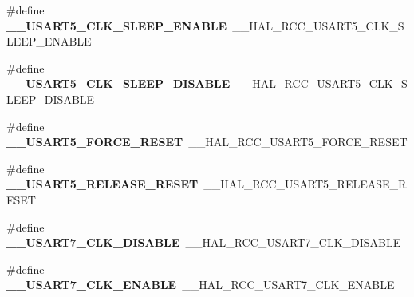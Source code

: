 \begin{DoxyCompactItemize}
\item 
\hypertarget{group___h_a_l___r_c_c___aliased_gab2e735cf263fe2d66068649c893f9421}{\#define {\bfseries \-\_\-\-\_\-\-U\-S\-A\-R\-T5\-\_\-\-C\-L\-K\-\_\-\-S\-L\-E\-E\-P\-\_\-\-E\-N\-A\-B\-L\-E}~\-\_\-\-\_\-\-H\-A\-L\-\_\-\-R\-C\-C\-\_\-\-U\-S\-A\-R\-T5\-\_\-\-C\-L\-K\-\_\-\-S\-L\-E\-E\-P\-\_\-\-E\-N\-A\-B\-L\-E}\label{group___h_a_l___r_c_c___aliased_gab2e735cf263fe2d66068649c893f9421}

\item 
\hypertarget{group___h_a_l___r_c_c___aliased_ga3ebcd8aa43ec53601b15d7ddd88c7a5f}{\#define {\bfseries \-\_\-\-\_\-\-U\-S\-A\-R\-T5\-\_\-\-C\-L\-K\-\_\-\-S\-L\-E\-E\-P\-\_\-\-D\-I\-S\-A\-B\-L\-E}~\-\_\-\-\_\-\-H\-A\-L\-\_\-\-R\-C\-C\-\_\-\-U\-S\-A\-R\-T5\-\_\-\-C\-L\-K\-\_\-\-S\-L\-E\-E\-P\-\_\-\-D\-I\-S\-A\-B\-L\-E}\label{group___h_a_l___r_c_c___aliased_ga3ebcd8aa43ec53601b15d7ddd88c7a5f}

\item 
\hypertarget{group___h_a_l___r_c_c___aliased_gaebc2c005ab8b9526cc9d9aa8d2fbc99d}{\#define {\bfseries \-\_\-\-\_\-\-U\-S\-A\-R\-T5\-\_\-\-F\-O\-R\-C\-E\-\_\-\-R\-E\-S\-E\-T}~\-\_\-\-\_\-\-H\-A\-L\-\_\-\-R\-C\-C\-\_\-\-U\-S\-A\-R\-T5\-\_\-\-F\-O\-R\-C\-E\-\_\-\-R\-E\-S\-E\-T}\label{group___h_a_l___r_c_c___aliased_gaebc2c005ab8b9526cc9d9aa8d2fbc99d}

\item 
\hypertarget{group___h_a_l___r_c_c___aliased_gaef0270121b0ce4da2cf3f994458326ef}{\#define {\bfseries \-\_\-\-\_\-\-U\-S\-A\-R\-T5\-\_\-\-R\-E\-L\-E\-A\-S\-E\-\_\-\-R\-E\-S\-E\-T}~\-\_\-\-\_\-\-H\-A\-L\-\_\-\-R\-C\-C\-\_\-\-U\-S\-A\-R\-T5\-\_\-\-R\-E\-L\-E\-A\-S\-E\-\_\-\-R\-E\-S\-E\-T}\label{group___h_a_l___r_c_c___aliased_gaef0270121b0ce4da2cf3f994458326ef}

\item 
\hypertarget{group___h_a_l___r_c_c___aliased_gaaf4f90ed2401b149fbda79ca0d8bc141}{\#define {\bfseries \-\_\-\-\_\-\-U\-S\-A\-R\-T7\-\_\-\-C\-L\-K\-\_\-\-D\-I\-S\-A\-B\-L\-E}~\-\_\-\-\_\-\-H\-A\-L\-\_\-\-R\-C\-C\-\_\-\-U\-S\-A\-R\-T7\-\_\-\-C\-L\-K\-\_\-\-D\-I\-S\-A\-B\-L\-E}\label{group___h_a_l___r_c_c___aliased_gaaf4f90ed2401b149fbda79ca0d8bc141}

\item 
\hypertarget{group___h_a_l___r_c_c___aliased_ga9686a6b050f6e8e97cbea3e270cb70a4}{\#define {\bfseries \-\_\-\-\_\-\-U\-S\-A\-R\-T7\-\_\-\-C\-L\-K\-\_\-\-E\-N\-A\-B\-L\-E}~\-\_\-\-\_\-\-H\-A\-L\-\_\-\-R\-C\-C\-\_\-\-U\-S\-A\-R\-T7\-\_\-\-C\-L\-K\-\_\-\-E\-N\-A\-B\-L\-E}\label{group___h_a_l___r_c_c___aliased_ga9686a6b050f6e8e97cbea3e270cb70a4}


\end{DoxyCompactItemize}
